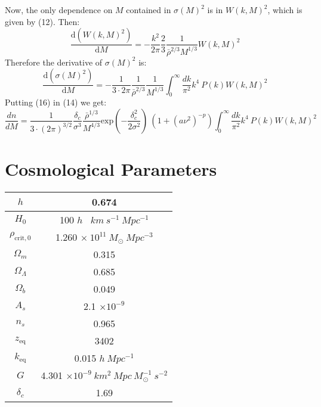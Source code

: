\documentclass{article}
\begin{document}
Now, the only dependence on $M$ contained in $\sigma(M)^2$ is in $W(k,M)^2$, which is given by (12). Then:
\begin{equation}
    \frac{\text{d}(W(k,M)^2)}{\text{d}M} = -\frac{k^2}{2\pi}\frac{2}{3}\frac{1}{\bar{\rho}^{2/3}M^{1/3}}W(k,M)^2
\end{equation}
Therefore the derivative of $\sigma(M)^2$ is:
\begin{equation}
    \frac{\text{d}(\sigma(M)^2)}{\text{d}M} = -\frac{1}{3\cdot 2\pi}\frac{1}{\bar{\rho}^{2/3}}\frac{1}{M^{1/3}}\int_0^\infty \frac{dk}{\pi^2} k^4 \ P(k) W(k,M)^2
\end{equation}
Putting (16) in (14) we get:
\begin{equation}
    \frac{dn}{dM}=\frac{1}{3\cdot (2\pi)^{3/2}}\frac{\delta_c}{\sigma^3}\frac{\bar{\rho}^{1/3}}{M^{4/3}}\text{exp}\left(-\frac{\delta_c^2}{2\sigma^2}\right) \ (1+(a\nu^2)^{-p})\int_0^\infty \frac{dk}{\pi^2} k^4 \ P(k) W(k,M)^2
\end{equation}
\newpage
\section{Cosmological Parameters}

\begin{center}
\begin{tabular}{ |c|c| } 
  \hline
   $h$ & 0.674 \\ 
  \hline
   $H_0$ & 100 $h$ \ $km  \ s^{-1} \ Mpc^{-1}$\\ 
  \hline
   $\rho_{\text{crit},0}$ & 1.260 $\times \ 10^{11} \ M_\odot \ Mpc^{-3}$   \\ 
  \hline
  $\Omega_m$ & 0.315 \\
  \hline
  $\Omega_\Lambda$ & 0.685 \\
  \hline
  $\Omega_b$ & 0.049 \\
  \hline
  $A_s$ & 2.1 $\times 10^{-9}$ \\
  \hline
  $n_s$ & 0.965 \\
  \hline
  $z_{\text{eq}}$ & 3402 \\
  \hline
  $k_{\text{eq}}$ & 0.015 $h \ Mpc^{-1} $ \\
  \hline 
  $G$ & 4.301 $\times 10^{-9} \ km^2 \ Mpc \ M_\odot^{-1} \ s^{-2} $ \\
  \hline
  $\delta_c$ & 1.69 \\
  \hline 
\end{tabular}
\end{center}

\newpage
\end{document}
